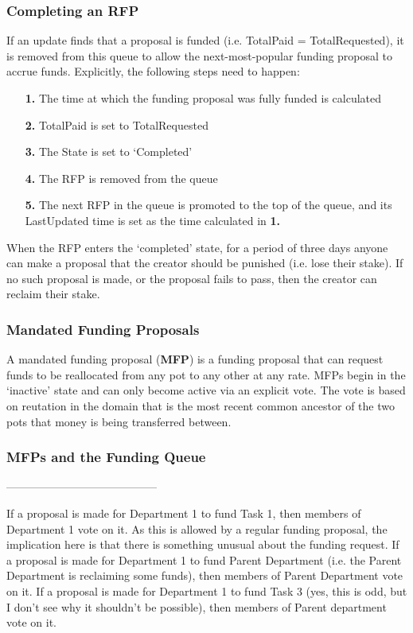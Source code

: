 \subsubsection*{Completing an RFP}
If an update finds that a proposal is funded (i.e. TotalPaid = TotalRequested), it is removed from this queue to allow the next-most-popular funding proposal to accrue funds. Explicitly, the following steps need to happen:
\begin{itemize}
 \item[\textbf{1.}] The time at which the funding proposal was fully funded is calculated
 \item[\textbf{2.}] TotalPaid is set to TotalRequested
 \item[\textbf{3.}] The State is set to `Completed'
 \item[\textbf{4.}] The RFP is removed from the queue
 \item[\textbf{5.}] The next RFP in the queue is promoted to the top of the queue, and its LastUpdated time is set as the time calculated in \textbf{1.}
\end{itemize}


When the RFP enters the `completed' state, for a period of three days anyone can make a proposal that the creator should be punished (i.e. lose their stake). If no such proposal is made, or the proposal fails to pass, then the creator can reclaim their stake.




\subsubsection{Mandated Funding Proposals}
A mandated funding proposal (\textbf{MFP}) is a funding proposal that can request funds to be reallocated from any pot to any other at any rate. MFPs begin in the `inactive' state and can only become active via an explicit vote. The vote is based on reutation in the domain that is the most recent common ancestor of the two pots that money is being transferred between.

\subsubsection*{MFPs and the Funding Queue}


-----------------------------------------

If a proposal is made for Department 1 to fund Task 1, then members of Department 1 vote on it. As this is allowed by a regular funding proposal, the implication here is that there is something unusual about the funding request.
If a proposal is made for Department 1 to fund Parent Department (i.e. the Parent Department is reclaiming some funds), then members of Parent Department vote on it.
If a proposal is made for Department 1 to fund Task 3 (yes, this is odd, but I don’t see why it shouldn’t be possible), then members of Parent department vote on it.


